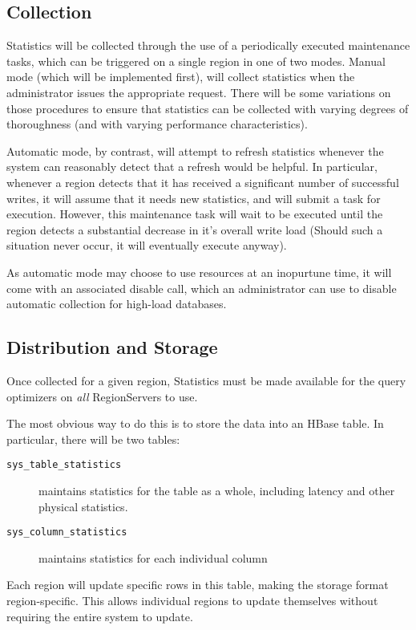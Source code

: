\subsection{Collection}
Statistics will be collected through the use of a periodically executed maintenance tasks, which can be triggered on a single region in one of two modes. Manual mode (which will be implemented first), will collect statistics when the administrator issues the appropriate request. There will be some variations on those procedures to ensure that statistics can be collected with varying degrees of thoroughness (and with varying performance characteristics).

Automatic mode, by contrast, will attempt to refresh statistics whenever the system can reasonably detect that a refresh would be helpful. In particular, whenever a region detects that it has received a significant number of successful writes, it will assume that it needs new statistics, and will submit a task for execution. However, this maintenance task will wait to be executed until the region detects a substantial decrease in it's overall write load (Should such a situation never occur, it will eventually execute anyway).

As automatic mode may choose to use resources at an inopurtune time, it will come with an associated disable call, which an administrator can use to disable automatic collection for high-load databases.

\subsection{Distribution and Storage}
Once collected for a given region, Statistics must be made available for the query optimizers on \emph{all} RegionServers to use. 

The most obvious way to do this is to store the data into an HBase table. In particular, there will be two tables: 

\begin{description}
				\item[\texttt{sys\_table\_statistics}] maintains statistics for the table as a whole, including latency and other physical statistics.
				\item[\texttt{sys\_column\_statistics}] maintains statistics for each individual column
\end{description}

Each region will update specific rows in this table, making the storage format region-specific. This allows individual regions to update themselves without requiring the entire system to update.

